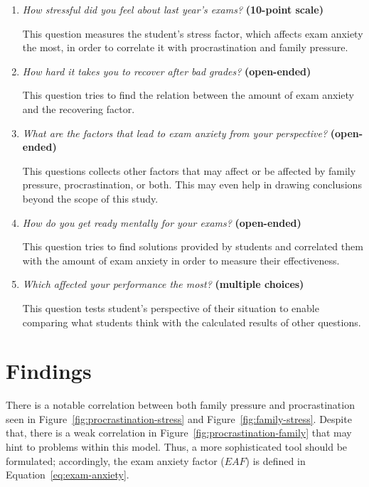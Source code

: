 \documentclass[12pt]{report}
\begin{document}
\begin{multicols}{2}
\begin{enumerate}[wide, labelwidth=!, labelindent=0pt]
\item \textit{How stressful did you feel about last year's exams?}
\textbf{(10-point scale)}

This question measures the student's stress factor, which affects exam anxiety
the most, in order to correlate it with procrastination and family pressure.

\item \textit{How hard it takes you to recover after bad grades?}
\textbf{(open-ended)}

This question tries to find the relation between the amount of exam anxiety
and the recovering factor.

\item \textit{What are the factors that lead to exam anxiety from your
perspective?}
\textbf{(open-ended)}

This questions collects other factors that may affect or be affected by family
pressure, procrastination, or both. This may even help in drawing conclusions
beyond the scope of this study.

\item \textit{How do you get ready mentally for your exams?}
\textbf{(open-ended)}

This question tries to find solutions provided by students and correlated them
with the amount of exam anxiety in order to measure their effectiveness.

\item \textit{Which affected your performance the most?}
\textbf{(multiple choices)}

This question tests student's perspective of their situation to enable comparing
what students think with the calculated results of other questions.

\end{enumerate}

\section{Findings}

There is a notable correlation between both family pressure and procrastination
seen in Figure~\ref{fig:procrastination-stress} and
Figure~\ref{fig:family-stress}. Despite that, there is a weak correlation in
Figure~\ref{fig:procrastination-family} that may hint to problems within this
model. Thus, a more sophisticated tool should be formulated; accordingly, the
exam anxiety factor ($EAF$) is defined in Equation~\ref{eq:exam-anxiety}.


\end{multicols}
\end{document}

